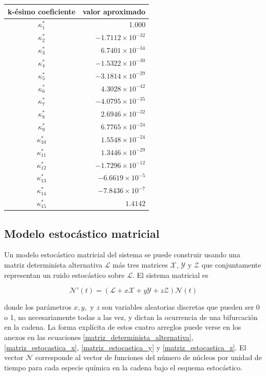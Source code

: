 \begin{center}
\begin{tabular}{|c|r|}
    \hline
    k-ésimo coeficiente & \multicolumn{1}{c|}{valor aproximado}\\\hline\hline
    $\kappa_1^*$ & 1.000 \\
    $\kappa_2^*$ & $-1.7112\times 10^{-32}$ \\
    $\kappa_3^*$ & $6.7401\times 10^{-34}$ \\
    $\kappa_4^*$ & $-1.5322\times 10^{-30}$ \\
    $\kappa_5^*$ & $-3.1814\times 10^{-29}$ \\
    $\kappa_6^*$ & $4.3028\times 10^{-42}$ \\
    $\kappa_7^*$ & $-4.0795\times 10^{-35}$ \\
    $\kappa_8^*$ & $2.6946\times 10^{-32}$ \\
    $\kappa_9^*$ &  $6.7765\times 10^{-24}$ \\
    $\kappa_{10}^*$ & $1.5548\times 10^{-24}$ \\
    $\kappa_{11}^*$ & $1.3446\times 10^{-29}$ \\
    $\kappa_{12}^*$ & $-1.7296\times 10^{-12}$ \\
    $\kappa_{13}^*$ & $-6.6619\times 10^{-5}$\\
    $\kappa_{14}^*$ & $-7.8436\times 10^{-7}$ \\
    $\kappa_{15}^*$ & $1.4142$\\
    \hline
\end{tabular}
\label{tabladecoeficientes2}
\end{center}

\subsection{Modelo estocástico matricial}
Un modelo estocástico matricial del sistema se puede construir usando una matriz determinista alternativa $\mathcal{L}$ más tres matrices $\mathcal{X}$, $\mathcal{Y}$ y $\mathcal{Z}$ que conjuntamente representan un ruido estocástico sobre $\mathcal{L}$. El sistema matricial es

\begin{equation}
	\mathcal{N}'(t)=(\mathcal{L}+x\mathcal{X}+y\mathcal{Y}+z\mathcal{Z})\mathcal{N}(t)
\end{equation}

\noindent donde los parámetros $x, y,\textrm{ y }z$ son variables aleatorias discretas que pueden ser 0 o 1, no necesariamente todas a las vez, y dictan la ocurrencia de una bifurcación en la cadena. La forma explícita de estos cuatro arreglos puede verse en los anexos en las ecuaciones \ref{matriz_determinista_alternativa}, \ref{matriz_estocastica_x}, \ref{matriz_estocastica_y} y \ref{matriz_estocastica_z}. El vector $\mathcal{N}$ corresponde al vector de funciones del número de núcleos por unidad de tiempo para cada especie química en la cadena bajo el esquema estocástico. 